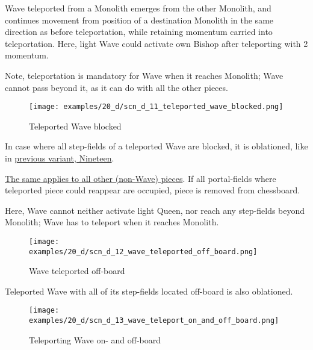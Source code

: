 \vspace*{-0.3\baselineskip}
Wave teleported from a Monolith emerges from the other Monolith, and continues
movement from position of a destination Monolith in the same direction as before
teleportation, while retaining momentum carried into teleportation.
Here, light Wave could activate own Bishop after teleporting with 2 momentum.

Note, teleportation is mandatory for Wave when it reaches Monolith; Wave cannot
pass beyond it, as it can do with all the other pieces.

\clearpage %

\vspace*{-3.2\baselineskip}
\noindent
\begin{figure}[!h]
\texttt{[image: examples/20\_d/scn\_d\_11\_teleported\_wave\_blocked.png]}
\caption{Teleported Wave blocked}
\label{fig:scn_d_11_teleported_wave_blocked}
\end{figure}

In case where all step-fields of a teleported Wave are blocked, it is oblationed, like in
\hyperref[fig:scn_n_06_teleport_wave_blocked]{previous variant, Nineteen}.

\hyperref[fig:scn_n_03_teleport_move_2]{The same applies to all other (non-Wave) pieces}.
If all portal-fields where teleported piece could reappear are occupied, piece is removed
from chessboard.

Here, Wave cannot neither activate light Queen, nor reach any step-fields beyond Monolith;
Wave has to teleport when it reaches Monolith.

\clearpage %

\vspace*{-3.2\baselineskip}
\noindent
\begin{figure}[!h]
\texttt{[image: examples/20\_d/scn\_d\_12\_wave\_teleported\_off\_board.png]}
\caption{Wave teleported off-board}
\label{fig:scn_d_12_wave_teleported_off_board}
\end{figure}

Teleported Wave with all of its step-fields located off-board is also oblationed.

\clearpage %

\noindent
\begin{figure}[!h]
\texttt{[image: examples/20\_d/scn\_d\_13\_wave\_teleport\_on\_and\_off\_board.png]}
\caption{Teleporting Wave on- and off-board}
\label{fig:scn_d_13_wave_teleport_on_and_off_board}
\end{figure}

